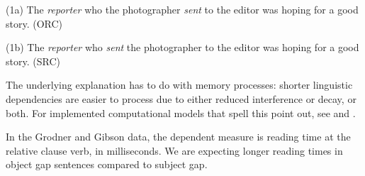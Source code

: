 \documentclass[12pt,]{krantz}
\newenvironment{Shaded}{\begin{snugshade}}{\end{snugshade}}
\newcommand{\CommentTok}[1]{\textcolor[rgb]{0.56,0.35,0.01}{\textit{#1}}}
\newcommand{\DataTypeTok}[1]{\textcolor[rgb]{0.13,0.29,0.53}{#1}}
\newcommand{\DecValTok}[1]{\textcolor[rgb]{0.00,0.00,0.81}{#1}}
\newcommand{\KeywordTok}[1]{\textcolor[rgb]{0.13,0.29,0.53}{\textbf{#1}}}
\newcommand{\NormalTok}[1]{#1}
\newcommand{\OperatorTok}[1]{\textcolor[rgb]{0.81,0.36,0.00}{\textbf{#1}}}
\newcommand{\StringTok}[1]{\textcolor[rgb]{0.31,0.60,0.02}{#1}}
\theoremstyle{definition}
\theoremstyle{definition}
\theoremstyle{definition}
\theoremstyle{remark}
\begin{document}
(1a) The \emph{reporter} who the photographer \emph{sent} to the editor was hoping for a good story. (ORC)

(1b) The \emph{reporter} who \emph{sent} the photographer to the editor was hoping for a good story. (SRC)

The underlying explanation has to do with memory processes: shorter linguistic dependencies are easier to process due to either reduced interference or decay, or both. For implemented computational models that spell this point out, see \citet{lewisvasishth:cogsci05} and \citet{EngelmannJaegerVasishthSubmitted2018}.

In the Grodner and Gibson data, the dependent measure is reading time at the relative clause verb, in milliseconds. We are expecting longer reading times in object gap sentences compared to subject gap.

\begin{Shaded}
\end{Shaded}
\end{document}
